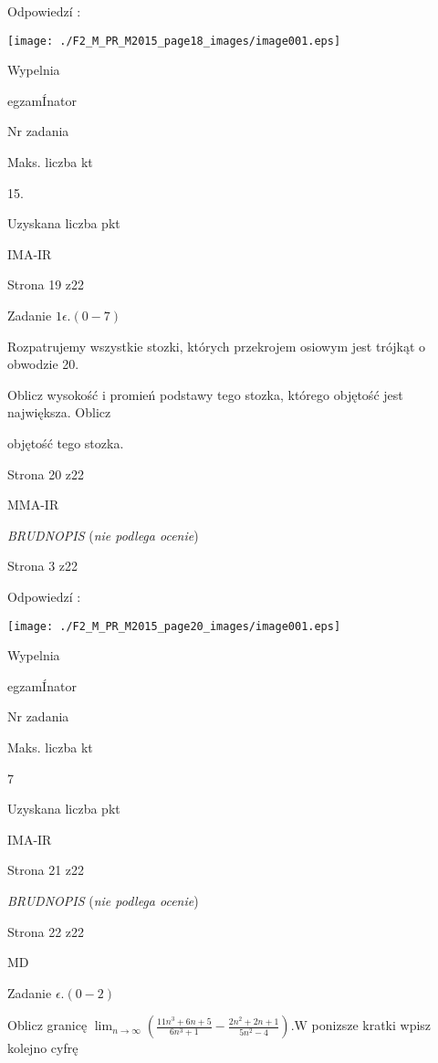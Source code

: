 \documentclass[a4paper,12pt]{article}
\begin{document}
Odpowiedzí :
\begin{center}
\texttt{[image: ./F2\_M\_PR\_M2015\_page18\_images/image001.eps]}
\end{center}
Wypelnia

egzamÍnator

Nr zadania

Maks. liczba kt

15.

Uzyskana liczba pkt

IMA-IR

Strona 19 z22





Zadanie $1\epsilon. (0-7)$

Rozpatrujemy wszystkie stozki, których przekrojem osiowym jest trójkąt o obwodzie 20.

Oblicz wysokość i promień podstawy tego stozka, którego objętość jest największa. Oblicz

objętość tego stozka.

Strona 20 z22

MMA-IR





{\it BRUDNOPIS} ({\it nie podlega ocenie})

Strona 3 z22





Odpowiedzí :
\begin{center}
\texttt{[image: ./F2\_M\_PR\_M2015\_page20\_images/image001.eps]}
\end{center}
Wypelnia

egzamÍnator

Nr zadania

Maks. liczba kt

7

Uzyskana liczba pkt

IMA-IR

Strona 21 z22





{\it BRUDNOPIS} ({\it nie podlega ocenie})

Strona 22 z22

MD





Zadanie $\epsilon.(0-2)$

Oblicz granicę $\displaystyle \lim_{n\rightarrow\infty}(\frac{11n^{3}+6n+5}{6n^{3}+1}-\frac{2n^{2}+2n+1}{5n^{2}-4}). \mathrm{W}$ ponizsze kratki wpisz kolejno cyfrę
\end{document}
